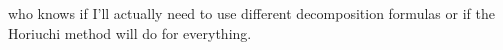 % 
who knows if I'll actually need to use different decomposition formulas or if the Horiuchi method will do for everything.